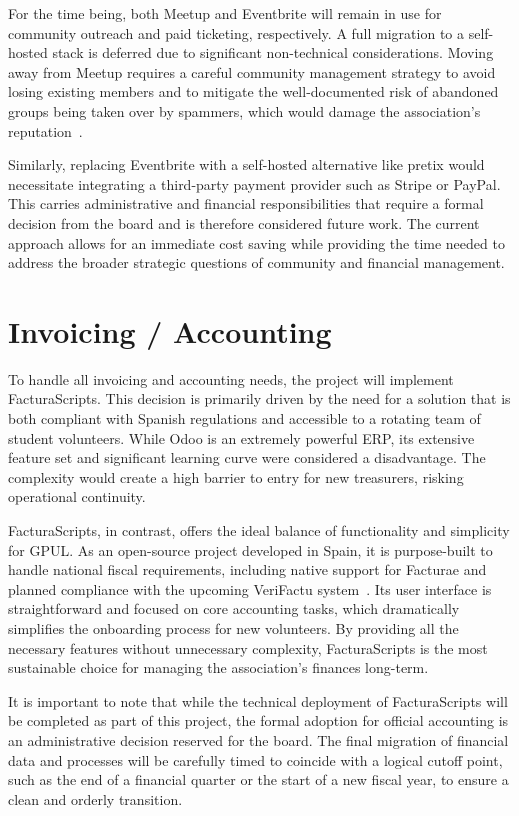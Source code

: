 For the time being, both Meetup and Eventbrite will remain in use for community outreach and paid ticketing, respectively. A full migration to a self-hosted stack is deferred due to significant non-technical considerations. Moving away from Meetup requires a careful community management strategy to avoid losing existing members and to mitigate the well-documented risk of abandoned groups being taken over by spammers, which would damage the association's reputation~\cite{combuilders-meetup-takeover}.

Similarly, replacing Eventbrite with a self-hosted alternative like pretix would necessitate integrating a third-party payment provider such as Stripe or PayPal. This carries administrative and financial responsibilities that require a formal decision from the board and is therefore considered future work. The current approach allows for an immediate cost saving while providing the time needed to address the broader strategic questions of community and financial management.

\section{Invoicing / Accounting}

To handle all invoicing and accounting needs, the project will implement FacturaScripts. This decision is primarily driven by the need for a solution that is both compliant with Spanish regulations and accessible to a rotating team of student volunteers. While Odoo is an extremely powerful ERP, its extensive feature set and significant learning curve were considered a disadvantage. The complexity would create a high barrier to entry for new treasurers, risking operational continuity.

FacturaScripts, in contrast, offers the ideal balance of functionality and simplicity for GPUL. As an open-source project developed in Spain, it is purpose-built to handle national fiscal requirements, including native support for Facturae and planned compliance with the upcoming VeriFactu system~\cite{facturascripts-antifraude}. Its user interface is straightforward and focused on core accounting tasks, which dramatically simplifies the onboarding process for new volunteers. By providing all the necessary features without unnecessary complexity, FacturaScripts is the most sustainable choice for managing the association's finances long-term.

It is important to note that while the technical deployment of FacturaScripts will be completed as part of this project, the formal adoption for official accounting is an administrative decision reserved for the board. The final migration of financial data and processes will be carefully timed to coincide with a logical cutoff point, such as the end of a financial quarter or the start of a new fiscal year, to ensure a clean and orderly transition.

